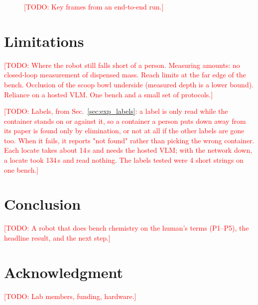 \documentclass[letterpaper, 10pt, journal, twoside]{IEEEtran}}
\newcommand{\todo}[1]{\textcolor{red}{[TODO: #1]}}
\newcommand{\placeholderfig}[3]{%
  \fbox{\parbox[c][#2][c]{#1}{\centering\footnotesize\textcolor{gray}{#3}}}}
\begin{document}
\begin{figure}[t]
  \centering
  \placeholderfig{0.95\columnwidth}{3.5cm}{Key-frame strip of one full run}
  \caption{\todo{Key frames from an end-to-end run.}}
  \label{fig:keyframes}
\end{figure}

\section{Limitations}
\label{sec:limitations}

\todo{Where the robot still falls short of a person. Measuring amounts:
no closed-loop measurement of dispensed mass. Reach limits at the far edge of the
bench. Occlusion of the scoop bowl underside (measured depth is a lower
bound). Reliance on a hosted VLM. One bench and a small set of
protocols.}

\todo{Labels, from Sec.~\ref{sec:exp_labels}: a label is only read while
the container stands on or against it, so a container a person puts
down away from its paper is found only by elimination, or not at all if
the other labels are gone too. When it fails, it reports "not found"
rather than picking the wrong container. Each locate takes about 14\,s
and needs the hosted VLM; with the network down, a locate took 134\,s and
read nothing. The labels tested were 4 short strings on one bench.}

\section{Conclusion}
\label{sec:conclusion}

\todo{A robot that does bench chemistry on the human's terms (P1--P5),
the headline result, and the next step.}

\ifcameraready
\section*{Acknowledgment}
\todo{Lab members, funding, hardware.}
\fi

\balance


\end{document}
